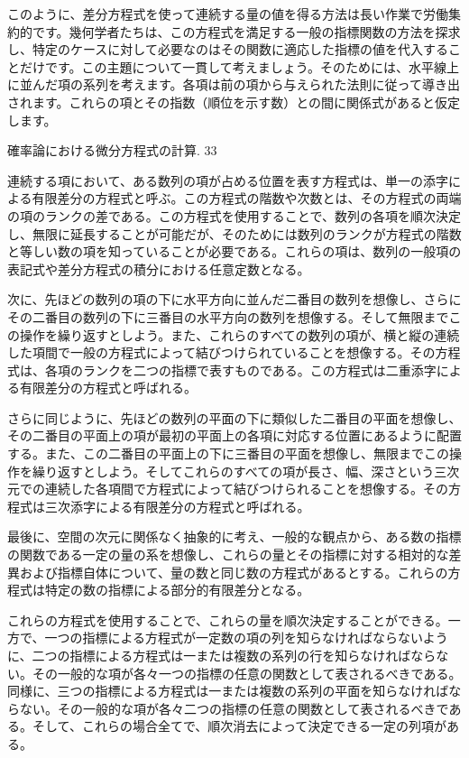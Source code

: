 \documentclass[a4paper,11pt,openany]{ltjsbook}
\begin{document}
このように、差分方程式を使って連続する量の値を得る方法は長い作業で労働集約的です。幾何学者たちは、この方程式を満足する一般の指標関数の方法を探求し、特定のケースに対して必要なのはその関数に適応した指標の値を代入することだけです。この主題について一貫して考えましょう。そのためには、水平線上に並んだ項の系列を考えます。各項は前の項から与えられた法則に従って導き出されます。これらの項とその指数（順位を示す数）との間に関係式があると仮定します。

確率論における微分方程式の計算. 33

連続する項において、ある数列の項が占める位置を表す方程式は、単一の添字による有限差分の方程式と呼ぶ。この方程式の階数や次数とは、その方程式の両端の項のランクの差である。この方程式を使用することで、数列の各項を順次決定し、無限に延長することが可能だが、そのためには数列のランクが方程式の階数と等しい数の項を知っていることが必要である。これらの項は、数列の一般項の表記式や差分方程式の積分における任意定数となる。

次に、先ほどの数列の項の下に水平方向に並んだ二番目の数列を想像し、さらにその二番目の数列の下に三番目の水平方向の数列を想像する。そして無限までこの操作を繰り返すとしよう。また、これらのすべての数列の項が、横と縦の連続した項間で一般の方程式によって結びつけられていることを想像する。その方程式は、各項のランクを二つの指標で表すものである。この方程式は二重添字による有限差分の方程式と呼ばれる。

さらに同じように、先ほどの数列の平面の下に類似した二番目の平面を想像し、その二番目の平面上の項が最初の平面上の各項に対応する位置にあるように配置する。また、この二番目の平面上の下に三番目の平面を想像し、無限までこの操作を繰り返すとしよう。そしてこれらのすべての項が長さ、幅、深さという三次元での連続した各項間で方程式によって結びつけられることを想像する。その方程式は三次添字による有限差分の方程式と呼ばれる。

最後に、空間の次元に関係なく抽象的に考え、一般的な観点から、ある数の指標の関数である一定の量の系を想像し、これらの量とその指標に対する相対的な差異および指標自体について、量の数と同じ数の方程式があるとする。これらの方程式は特定の数の指標による部分的有限差分となる。

これらの方程式を使用することで、これらの量を順次決定することができる。一方で、一つの指標による方程式が一定数の項の列を知らなければならないように、二つの指標による方程式は一または複数の系列の行を知らなければならない。その一般的な項が各々一つの指標の任意の関数として表されるべきである。同様に、三つの指標による方程式は一または複数の系列の平面を知らなければならない。その一般的な項が各々二つの指標の任意の関数として表されるべきである。そして、これらの場合全てで、順次消去によって決定できる一定の列項がある。
\end{document}
